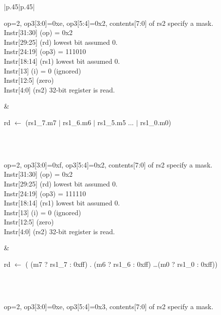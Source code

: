 \documentclass{book}
\begin{document}
\begin{table}[p]
  \centering
  \begin{tabular}[p]{|p{.45\textwidth}|p{.45\textwidth}|}
    \hline
{} \\ 
 \hline 
 \parbox{\linewidth}{op=2, op3[3:0]=0xe, op3[5:4]=0x2, contents[7:0]
    of rs2 specify a mask.\\

    Instr[31:30] (op) = 0x2\\
    Instr[29:25] (rd)    lowest bit assumed 0.\\
    Instr[24:19] (op3) = 111010\\
    Instr[18:14] (rs1)   lowest bit assumed 0.\\
    Instr[13]    (i)  = 0 (ignored)\\
    Instr[12:5]   (zero)\\
    Instr[4:0]   (rs2)   32-bit register is read.\\
} & 
 \parbox{\linewidth}{rd $\leftarrow$ (rs1\_7.m7 $\vert$ rs1\_6.m6 $\vert$ rs1\_5.m5 ... $\vert$ rs1\_0.m0)}\\
\hline
\hline
{} \\ 
 \hline 
 \parbox{\linewidth}{op=2, op3[3:0]=0xf, op3[5:4]=0x2, contents[7:0]
    of rs2 specify a mask.\\

    Instr[31:30] (op) = 0x2\\
    Instr[29:25] (rd)    lowest bit assumed 0.\\
    Instr[24:19] (op3) = 111110\\
    Instr[18:14] (rs1)   lowest bit assumed 0.\\
    Instr[13]    (i)  = 0 (ignored)\\
    Instr[12:5]   (zero)\\
    Instr[4:0]   (rs2)   32-bit register is read.\\
} & 
 \parbox{\linewidth}{rd $\leftarrow$ ( (m7 ? rs1\_7 : 0xff) . (m6 ? rs1\_6 : 0xff) \ldots (m0 ? rs1\_0 : 0xff))}\\
\hline
\hline
{} \\ 
 \hline 
 \parbox{\linewidth}{op=2, op3[3:0]=0xe, op3[5:4]=0x3, contents[7:0]
    of rs2 specify a mask.\\

}
\end{tabular}
\end{table}
\end{document}
